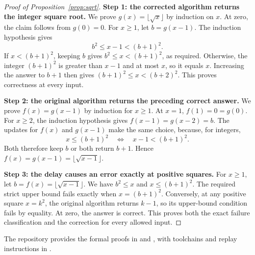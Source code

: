 \begin{proof}[Proof of Proposition~\ref{prop:sqrt}]
\textbf{Step 1: the corrected algorithm returns the integer square root.}
We prove $g(x)=\lfloor\sqrt{x}\rfloor$ by induction on $x$.
At zero, the claim follows from $g(0)=0$. For $x\ge1$, let $b=g(x-1)$.
The induction hypothesis gives
\[
b^2\le x-1<(b+1)^2.
\]
If $x<(b+1)^2$, keeping $b$ gives $b^2\le x<(b+1)^2$, as required.
Otherwise, the integer $(b+1)^2$ is greater than $x-1$ and at most $x$,
so it equals $x$. Increasing the answer to $b+1$ then gives
$(b+1)^2\le x<(b+2)^2$. This proves correctness at every input.

\textbf{Step 2: the original algorithm returns the preceding correct answer.}
We prove $f(x)=g(x-1)$ by induction for $x\ge1$. At $x=1$,
$f(1)=0=g(0)$. For $x\ge2$, the induction hypothesis gives
$f(x-1)=g(x-2)=b$. The updates for $f(x)$ and $g(x-1)$ make the same
choice, because, for integers,
\[
x\le(b+1)^2\quad\Longleftrightarrow\quad x-1<(b+1)^2.
\]
Both therefore keep $b$ or both return $b+1$. Hence
$f(x)=g(x-1)=\lfloor\sqrt{x-1}\rfloor$.

\textbf{Step 3: the delay causes an error exactly at positive squares.}
For $x\ge1$, let $b=f(x)=\lfloor\sqrt{x-1}\rfloor$. We have
$b^2\le x$ and $x\le(b+1)^2$. The required strict upper bound fails
exactly when $x=(b+1)^2$. Conversely, at any positive square $x=k^2$,
the original algorithm returns $k-1$, so its upper-bound condition fails
by equality. At zero, the answer is correct. This proves both the exact
failure classification and the correction for every allowed input.
\end{proof}

The repository provides the formal proofs in
 and
,
with toolchains and replay instructions in .
